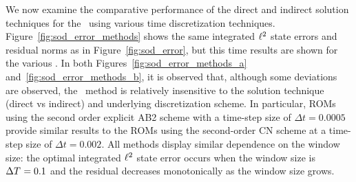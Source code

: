We now examine the comparative performance of the direct and indirect solution techniques for the \methodAcronymROMs\ using various time discretization techniques. 
Figure~\ref{fig:sod_error_methods} 
shows the same integrated $\ell^2$ state errors and residual norms as in Figure~\ref{fig:sod_error}, but this time results are shown for 
the various \methodAcronymROMs. In both Figures~\ref{fig:sod_error_methods_a} and~\ref{fig:sod_error_methods_b}, it is observed that, although some 
deviations are observed, the \methodAcronym\ method is relatively insensitive to the solution technique (direct vs indirect) and underlying discretization scheme.
In particular, ROMs using the second order explicit AB2 scheme with a time-step size of $\Delta t = 0.0005$ provide similar results to the 
ROMs using the second-order CN scheme at a time-step size of $\Delta t = 0.002$. All methods display similar dependence on the window size: the optimal integrated 
$\ell^2$ state error occurs when the window size is $\Delta T^{} = 0.1$ and the residual decreases monotonically as the window size grows. 
